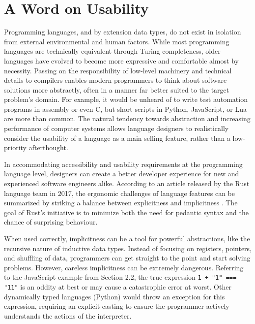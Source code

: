\documentclass{article}
\begin{document}
\section{A Word on Usability}

Programming languages, and by extension data types, do not exist in isolation from external environmental and human factors.
While most programming languages are technically equivalent through Turing completeness,
older languages have evolved to become more expressive and comfortable almost by necessity.
Passing on the responsibility of low-level machinery and technical details
to compilers enables modern programmers to think about
software solutions more abstractly, often in a manner far better suited to the target problem's domain.
For example, it would be unheard of to write test automation programs in assembly or even C,
but short scripts in Python, JavaScript, or Lua are more than common.
The natural tendency towards abstraction and increasing performance of computer systems
allows language designers to realistically consider the usability of a language as a main selling feature,
rather than a low-priority afterthought.

In accommodating accessibility and usability requirements at the programming language level,
designers can create a better developer experience for new and experienced software engineers alike.
According to an article released by the Rust language team in 2017, the ergonomic challenges
of language features can be summarized by striking a balance between explicitness and implicitness \cite{rust2017}.
The goal of Rust's initiative is to minimize both the need for pedantic syntax and the chance of surprising
behaviour.

When used correctly, implicitness can be a tool for powerful abstractions, like the recursive nature of inductive data types.
Instead of focusing on registers, pointers, and shuffling of data, programmers can get straight to the point and
start solving problems. However, careless implicitness can be extremely dangerous. Referring to the JavaScript example
from Section 2.2, the true expression \texttt{1 + "1" === "11"} is an oddity at best or may cause a catastrophic error
at worst. Other dynamically typed languages (Python) would throw an exception for this expression,
requiring an explicit casting to ensure the programmer actively understands the actions of the interpreter.
\end{document}
